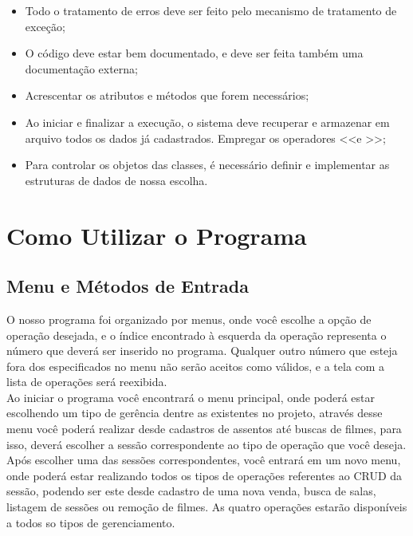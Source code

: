 \documentclass[a4paper]{article}
\begin{document}
\begin{itemize}
\item{Todo o tratamento de erros deve ser feito pelo mecanismo de tratamento de exceção;}

\item{O código deve estar bem documentado, e deve ser feita também uma documentação externa;}

\item{Acrescentar os atributos e métodos que forem necessários;}

\item{Ao iniciar e finalizar a execução, o sistema deve recuperar e armazenar em arquivo todos os dados já cadastrados. Empregar os operadores \textless\textless e \textgreater\textgreater;}

\item{Para controlar os objetos das classes, é necessário definir e implementar as estruturas de dados de nossa escolha.}

\end{itemize} 

\section{Como Utilizar o Programa}
\subsection{Menu e Métodos de Entrada}
\hspace{5 mm}O nosso programa foi organizado por menus, onde você escolhe a opção de operação desejada, e o índice encontrado à esquerda da operação representa o número que deverá ser inserido no programa. Qualquer outro número que esteja fora dos especificados no menu não serão aceitos como válidos, e a tela com a lista de operações será reexibida.\\
\quad{\null}\hspace{5 mm}Ao iniciar o programa você encontrará o menu principal, onde poderá estar escolhendo um tipo de gerência dentre as existentes no projeto, através desse menu você poderá realizar desde cadastros de assentos até buscas de filmes, para isso, deverá escolher a sessão correspondente ao tipo de operação que você deseja.\\
\quad{\null}\hspace{5 mm}Após escolher uma das sessões correspondentes, você entrará em um novo menu, onde poderá estar realizando todos os tipos de operações referentes ao CRUD da sessão, podendo ser este desde cadastro de uma nova venda, busca de salas, listagem de sessões ou remoção de filmes. As quatro operações estarão disponíveis a todos so tipos de gerenciamento.\\
\end{document}
